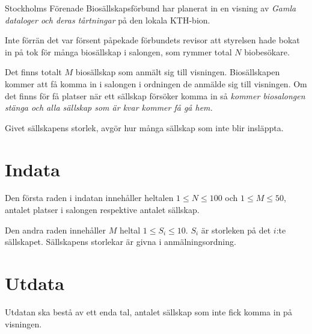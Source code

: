 
Stockholms Förenade Biosällskapsförbund har planerat in en visning av \emph{Gamla dataloger och deras tårtningar} på den lokala KTH-bion.

Inte förrän det var försent påpekade förbundets revisor att styrelsen hade bokat in på tok för många biosällskap i salongen, som rymmer total $N$ biobesökare.

Det finns totalt $M$ biosällskap som anmält sig till visningen. Biosällskapen kommer att få komma in i salongen i ordningen de anmälde sig till visningen. Om det finns för få platser när ett sällskap försöker komma in så \emph{kommer biosalongen stänga och alla sällskap som är kvar kommer få gå hem.}

Givet sällskapens storlek, avgör hur många sällskap som inte blir insläppta.

\section*{Indata}
Den första raden i indatan innehåller heltalen $1 \le N \le 100$ och $1 \le M \le 50$, antalet platser i salongen respektive antalet sällskap.

Den andra raden innehåller $M$ heltal $1 \le S_i \le 10$. $S_i$ är storleken på det $i$:te sällskapet. Sällskapens storlekar är givna i anmälningsordning.


\section*{Utdata}
Utdatan ska bestå av ett enda tal, antalet sällskap som inte fick komma in på visningen.
